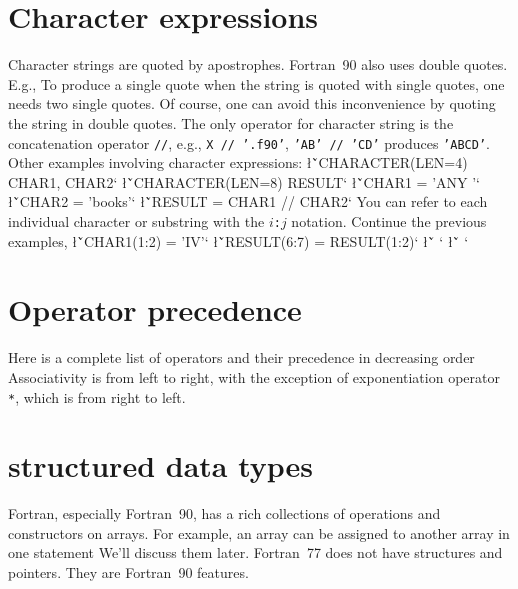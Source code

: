 {\section{Character expressions}
Character strings are quoted by apostrophes.  Fortran~90 also uses
double quotes. E.g.,
\sms
{}
\sms
To produce a single quote when the string is quoted with single quotes, 
one needs two single quotes.  Of course, one can avoid this inconvenience 
by quoting the string in double quotes.  The only operator for
character string is the concatenation operator {\tt //}, e.g., 
{\tt X // '.f90'}, {\tt 'AB' // 'CD'} produces {\tt 'ABCD'}.  Other
examples involving character expressions:
\sms
\l{\v`CHARACTER(LEN=4) CHAR1, CHAR2`}
\l{\v`CHARACTER(LEN=8) RESULT`}
\l{\v`CHAR1 = 'ANY '`}
\l{\v`CHAR2 = 'books'`}
\l{\v`RESULT = CHAR1 // CHAR2`}
\sms
You can refer to each individual character or substring with the
$i${\tt :}$j$ notation. Continue the previous examples,
\sms
\l{\v`CHAR1(1:2) = 'IV'`}
\l{\v`RESULT(6:7) = RESULT(1:2)`}
\l{\v` `}
\l{\v` `}
\sms

\section{Operator precedence}
Here is a complete list of operators and their precedence in 
decreasing order
\sms
{}
\sms
Associativity is from left to right, with the exception of exponentiation
operator {\tt **}, which is from right to left.

\section{structured data types}
Fortran,  especially Fortran~90, has a rich collections of operations
and constructors on arrays.  For example, an array can be assigned to
another array in one statement
\sms
{}
\sms
We'll discuss them later.  Fortran~77 does not have structures
and pointers.  They are Fortran~90 features.

}
